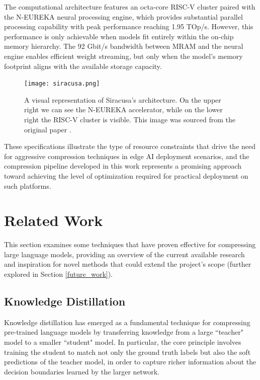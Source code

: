 The computational architecture features an octa-core RISC-V cluster paired with the N-EUREKA neural processing engine, which provides substantial parallel processing capability with peak performance reaching 1.95 TOp/s. However, this performance is only achievable when models fit entirely within the on-chip memory hierarchy. The 92 Gbit/s bandwidth between MRAM and the neural engine enables efficient weight streaming, but only when the model's memory footprint aligns with the available storage capacity.

\begin{figure}[htbp]
    \centering
    \texttt{[image: siracusa.png]}
    \caption[The Architecture of Siracusa]{A visual representation of Siracusa's architecture. On the upper right we can see the N-EUREKA accelerator, while on the lower right the RISC-V cluster is visible. This image was sourced from the original paper \cite{target_hardware}.}
    \label{fig:siracusa}
\end{figure}

These specifications illustrate the type of resource constraints that drive the need for aggressive compression techniques in edge AI deployment scenarios, and the compression pipeline developed in this work represents a promising approach toward achieving the level of optimization required for practical deployment on such platforms.

\section{Related Work}

This section examines some techniques that have proven effective for compressing large language models, providing an overview of the current available research and inspiration for novel methods that could extend the project's scope (further explored in Section \ref{future_work}).

\subsection{Knowledge Distillation} \label{distillation_paragraph}

Knowledge distillation \cite{distillation} has emerged as a fundamental technique for compressing pre-trained language models by transferring knowledge from a large ``teacher" model to a smaller ``student" model. In particular, the core principle involves training the student to match not only the ground truth labels but also the soft predictions of the teacher model, in order to capture richer information about the decision boundaries learned by the larger network.

